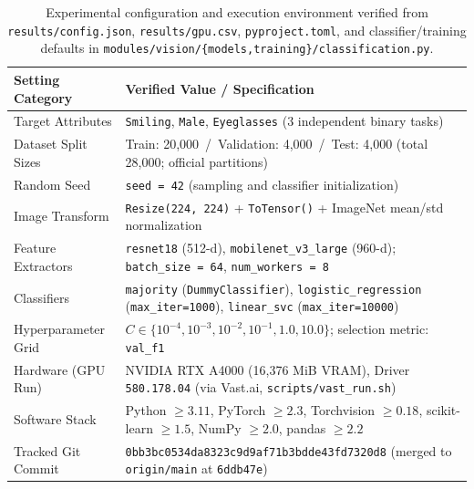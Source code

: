 \documentclass[12pt,a4paper]{article}
\newcommand{\code}[1]{\texttt{#1}}
\begin{document}
\begin{table}[H]
  \centering
  \caption[Experimental configuration and execution environment]{Experimental configuration and execution environment verified from \code{results/\allowbreak{}config.json}, \code{results/\allowbreak{}gpu.csv}, \code{pyproject.toml}, and classifier/training defaults in \code{modules/\allowbreak{}vision/\allowbreak{}\{models,training\}/\allowbreak{}classification.py}.}
  \label{tab:exp_setup}
  \small
  \begin{tabularx}{\textwidth}{@{}l Y@{}}
    \toprule
    \textbf{Setting Category} & \textbf{Verified Value / Specification} \\
    \midrule
    Target Attributes & \code{Smiling}, \code{Male}, \code{Eyeglasses} (3 independent binary tasks) \\
    Dataset Split Sizes & Train: 20,000 \,/\, Validation: 4,000 \,/\, Test: 4,000 (total 28,000; official partitions) \\
    Random Seed & \code{seed = 42} (sampling and classifier initialization) \\
    Image Transform & \code{Resize(224, 224)} + \code{ToTensor()} + ImageNet mean/std normalization \\
    Feature Extractors & \code{resnet18} (512-d), \code{mobilenet\_\allowbreak{}v3\_\allowbreak{}large} (960-d); \code{batch\_\allowbreak{}size = 64}, \code{num\_\allowbreak{}workers = 8} \\
    Classifiers & \code{majority} (\code{DummyClassifier}), \code{logistic\_\allowbreak{}regression} (\code{max\_\allowbreak{}iter=1000}), \code{linear\_\allowbreak{}svc} (\code{max\_\allowbreak{}iter=10000}) \\
    Hyperparameter Grid & $C \in \{10^{-4}, 10^{-3}, 10^{-2}, 10^{-1}, 1.0, 10.0\}$; selection metric: \code{val\_\allowbreak{}f1} \\
    Hardware (GPU Run) & NVIDIA RTX A4000 (16,376 MiB VRAM), Driver \code{580.178.04} (via Vast.ai, \code{scripts/\allowbreak{}vast\_\allowbreak{}run.sh}) \\
    Software Stack & Python $\ge 3.11$, PyTorch $\ge 2.3$, Torchvision $\ge 0.18$, scikit-learn $\ge 1.5$, NumPy $\ge 2.0$, pandas $\ge 2.2$ \\
    Tracked Git Commit & \code{0bb3bc0534da8323c9d9af71b3bdde43fd7320d8} (merged to \code{origin/\allowbreak{}main} at \code{6ddb47e}) \\
    \bottomrule
  \end{tabularx}
\end{table}
\end{document}
